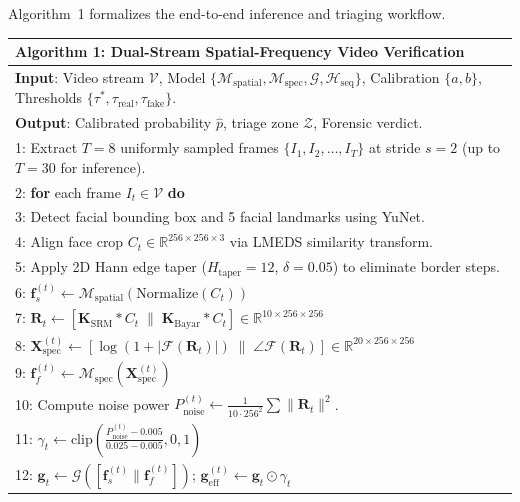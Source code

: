 \documentclass[10pt,twocolumn,letterpaper]{article}
\begin{document}
Algorithm~1 formalizes the end-to-end inference and triaging workflow.

\begin{table}[h]
\centering
\small
\begin{tabular}{p{}}
\toprule
\textbf{Algorithm 1: Dual-Stream Spatial-Frequency Video Verification} \\
\midrule
\textbf{Input}: Video stream $\mathcal{V}$, Model $\{\mathcal{M}_{\mathrm{spatial}}, \mathcal{M}_{\mathrm{spec}}, \mathcal{G}, \mathcal{H}_{\mathrm{seq}}\}$, Calibration $\{a, b\}$, Thresholds $\{\tau^*, \tau_{\mathrm{real}}, \tau_{\mathrm{fake}}\}$. \\
\textbf{Output}: Calibrated probability $\hat{p}$, triage zone $\mathcal{Z}$, Forensic verdict. \\
\midrule
1: Extract $T = 8$ uniformly sampled frames $\{I_1, I_2, \dots, I_T\}$ at stride $s = 2$ (up to $T=30$ for inference). \\
2: \textbf{for} each frame $I_t \in \mathcal{V}$ \textbf{do} \\
3: \quad Detect facial bounding box and 5 facial landmarks using YuNet. \\
4: \quad Align face crop $C_t \in \mathbb{R}^{256 \times 256 \times 3}$ via LMEDS similarity transform. \\
5: \quad Apply 2D Hann edge taper ($H_{\mathrm{taper}} = 12$, $\delta = 0.05$) to eliminate border steps. \\
6: \quad $\mathbf{f}_s^{(t)} \leftarrow \mathcal{M}_{\mathrm{spatial}}(\mathrm{Normalize}(C_t))$ \\
7: \quad $\mathbf{R}_t \leftarrow [\mathbf{K}_{\mathrm{SRM}} * C_t \;\parallel\; \mathbf{K}_{\mathrm{Bayar}} * C_t] \in \mathbb{R}^{10 \times 256 \times 256}$ \\
8: \quad $\mathbf{X}_{\mathrm{spec}}^{(t)} \leftarrow [\log(1 + |\mathcal{F}(\mathbf{R}_t)|) \;\parallel\; \angle\mathcal{F}(\mathbf{R}_t)] \in \mathbb{R}^{20 \times 256 \times 256}$ \\
9: \quad $\mathbf{f}_f^{(t)} \leftarrow \mathcal{M}_{\mathrm{spec}}(\mathbf{X}_{\mathrm{spec}}^{(t)})$ \\
10: \quad Compute noise power $P_{\mathrm{noise}}^{(t)} \leftarrow \frac{1}{10 \cdot 256^2}\sum \|\mathbf{R}_t\|^2$. \\
11: \quad $\gamma_t \leftarrow \mathrm{clip}\left(\frac{P_{\mathrm{noise}}^{(t)} - 0.005}{0.025 - 0.005}, 0, 1\right)$ \\
12: \quad $\mathbf{g}_t \leftarrow \mathcal{G}([\mathbf{f}_s^{(t)} \parallel \mathbf{f}_f^{(t)}])$; \quad $\mathbf{g}_{\mathrm{eff}}^{(t)} \leftarrow \mathbf{g}_t \odot \gamma_t$ \\

\end{tabular}
\end{table}
\end{document}
